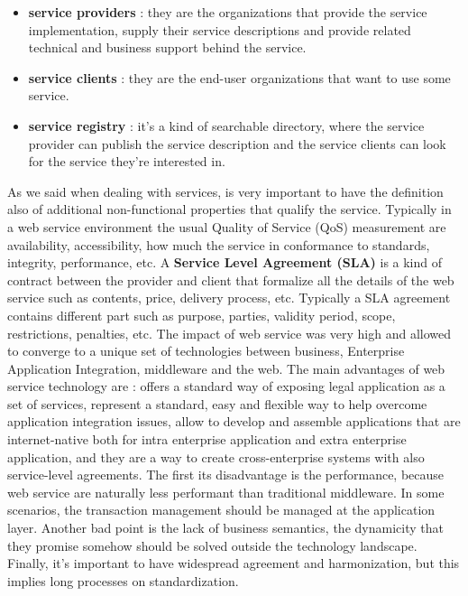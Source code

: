 \begin{itemize}
    \item \textbf{service providers} : they are the organizations that provide the service implementation, supply their service descriptions and provide related technical and business support behind the service.
    \item \textbf{service clients} : they are the end-user organizations that want to use some service.
    \item \textbf{service registry} : it's a kind of searchable directory, where the service provider can publish the service description and the service clients can look for the service they're interested in.
\end{itemize}
As we said when dealing with services, is very important to have the definition also of additional non-functional properties that qualify the service. Typically in a web service environment the usual Quality of Service (QoS) measurement are availability, accessibility, how much the service in conformance to standards, integrity, performance, etc. A \textbf{Service Level Agreement (SLA)} is a kind of contract between the provider and client that formalize all the details of the web service such as contents, price, delivery process, etc. Typically a SLA agreement contains different part such as purpose, parties, validity period, scope, restrictions, penalties, etc. The impact of web service was very high and allowed to converge to a unique set of technologies between business, Enterprise Application Integration, middleware and the web. The main advantages of web service technology are : offers a standard way of exposing legal application as a set of services, represent a standard, easy and flexible way to help overcome application integration issues, allow to develop and assemble applications that are internet-native both for intra enterprise application and extra enterprise application, and they are a way to create cross-enterprise systems with also service-level agreements. The first its disadvantage is the performance, because web service are naturally less performant than traditional middleware. In some scenarios, the transaction management should be managed at the application layer. Another bad point is the lack of business semantics, the dynamicity that they promise somehow should be solved outside the technology landscape. Finally, it's important to have widespread agreement and harmonization, but this implies long processes on standardization.
